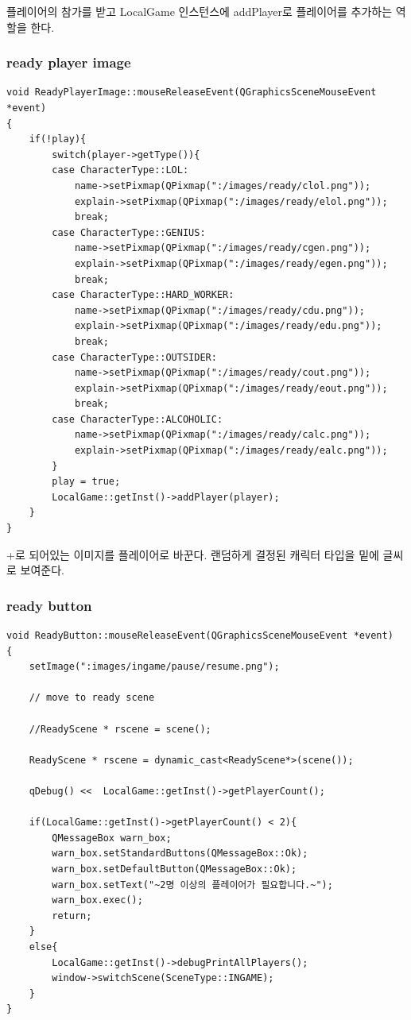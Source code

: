 \documentclass[10pt,oneside,a4paper,titlepage]{article}
\begin{document}
플레이어의 참가를 받고 LocalGame 인스턴스에 addPlayer로 플레이어를 추가하는 역할을 한다.

\subsubsection{ready player image}

\begin{lstlisting}
void ReadyPlayerImage::mouseReleaseEvent(QGraphicsSceneMouseEvent *event)
{
    if(!play){
        switch(player->getType()){
        case CharacterType::LOL:
            name->setPixmap(QPixmap(":/images/ready/clol.png"));
            explain->setPixmap(QPixmap(":/images/ready/elol.png"));
            break;
        case CharacterType::GENIUS:
            name->setPixmap(QPixmap(":/images/ready/cgen.png"));
            explain->setPixmap(QPixmap(":/images/ready/egen.png"));
            break;
        case CharacterType::HARD_WORKER:
            name->setPixmap(QPixmap(":/images/ready/cdu.png"));
            explain->setPixmap(QPixmap(":/images/ready/edu.png"));
            break;
        case CharacterType::OUTSIDER:
            name->setPixmap(QPixmap(":/images/ready/cout.png"));
            explain->setPixmap(QPixmap(":/images/ready/eout.png"));
            break;
        case CharacterType::ALCOHOLIC:
            name->setPixmap(QPixmap(":/images/ready/calc.png"));
            explain->setPixmap(QPixmap(":/images/ready/ealc.png"));
        }
        play = true;
        LocalGame::getInst()->addPlayer(player);
    }
}
\end{lstlisting}

+로 되어있는 이미지를 플레이어로 바꾼다. 랜덤하게 결정된 캐릭터 타입을 밑에 글씨로 보여준다. 

\subsubsection{ready button}

\begin{lstlisting}[escapeinside=~~]
void ReadyButton::mouseReleaseEvent(QGraphicsSceneMouseEvent *event)
{
    setImage(":images/ingame/pause/resume.png");

    // move to ready scene

    //ReadyScene * rscene = scene();

    ReadyScene * rscene = dynamic_cast<ReadyScene*>(scene());

    qDebug() <<  LocalGame::getInst()->getPlayerCount();

    if(LocalGame::getInst()->getPlayerCount() < 2){
        QMessageBox warn_box;
        warn_box.setStandardButtons(QMessageBox::Ok);
        warn_box.setDefaultButton(QMessageBox::Ok);
        warn_box.setText("~2명 이상의 플레이어가 필요합니다.~");
        warn_box.exec();
        return;
    }
    else{
        LocalGame::getInst()->debugPrintAllPlayers();
        window->switchScene(SceneType::INGAME);
    }
}
\end{lstlisting}
\end{document}
